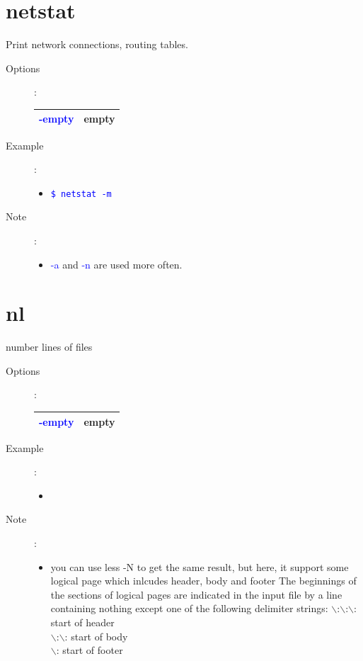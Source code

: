 \documentclass[a4paper,12pt,twoside]{book}
\newcommand{\linuxcommand}[1]{\texttt{\textcolor{blue}{\$ #1 \Pisymbol{psy}{191}}}}
\newcommand{\op}[1]{\textcolor{blue}{-#1}}
\begin{document}
\begin{CJK*}{UTF8}{song}
\section{netstat}
	Print network connections, routing tables.
	\begin{description}
	\item[Options]: \\
		\begin{tabular}{c|p{}}
		\hline
		\op{empty} & empty\\
		\hline
		\end{tabular}
	\item[Example]:
		\begin{itemize}
		\item \linuxcommand{netstat -m}
		\end{itemize}
	\item[Note]:
		\begin{itemize}
		\item \op{a} and \op{n} are used more often.
		\end{itemize}
	\end{description}
\section{nl}
	number lines of files
	\begin{description}
	\item[Options]: \\
		\begin{tabular}{c|p{}}
		\hline
		\op{empty} & empty\\
		\hline
		\end{tabular}
	\item[Example]:
		\begin{itemize}
		\item
		\end{itemize}
	\item[Note]:
		\begin{itemize}
		\item  you can use less -N to get the same result, but here, it support some logical page which inlcudes header, body and footer
			The beginnings of the sections of logical pages are indicated in the input file by a line containing nothing except one of the following delimiter strings:
			$\backslash$:$\backslash$:$\backslash$: start of header \\
			$\backslash$:$\backslash$: start of body \\
			$\backslash$: start of footer \\
		\end{itemize}
	\end{description}

\end{CJK*}
\end{document}

